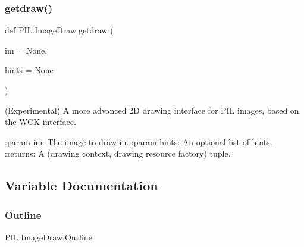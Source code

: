\subsubsection{\texorpdfstring{getdraw()}{getdraw()}}
{\footnotesize\ttfamily def P\+I\+L.\+Image\+Draw.\+getdraw (\begin{DoxyParamCaption}\item[{}]{im = {\ttfamily None},  }\item[{}]{hints = {\ttfamily None} }\end{DoxyParamCaption})}

\begin{DoxyVerb}(Experimental) A more advanced 2D drawing interface for PIL images,
based on the WCK interface.

:param im: The image to draw in.
:param hints: An optional list of hints.
:returns: A (drawing context, drawing resource factory) tuple.
\end{DoxyVerb}
 

\subsection{Variable Documentation}
\mbox{\label{namespacePIL_1_1ImageDraw_aee58acc4f36851df639ca75bdcc41ab7}} 
\subsubsection{\texorpdfstring{Outline}{Outline}}
{\footnotesize\ttfamily P\+I\+L.\+Image\+Draw.\+Outline}


